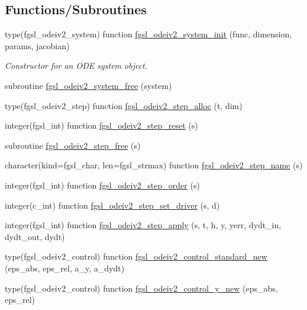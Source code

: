 \subsection*{Functions/\+Subroutines}
\begin{DoxyCompactItemize}
\item 
type(fgsl\+\_\+odeiv2\+\_\+system) function \hyperlink{ode_8finc_a2ffec24e60a38bee53c48aa9c9e3c1b7}{fgsl\+\_\+odeiv2\+\_\+system\+\_\+init} (func, dimension, params, jacobian)
\begin{DoxyCompactList}\small\item\em Constructor for an O\+D\+E system object. \end{DoxyCompactList}\item 
subroutine \hyperlink{ode_8finc_ab973a74e019e0e361f76db2a15b1ce5d}{fgsl\+\_\+odeiv2\+\_\+system\+\_\+free} (system)
\item 
type(fgsl\+\_\+odeiv2\+\_\+step) function \hyperlink{ode_8finc_a38ccf460c6a701df582e42b350fd9eaf}{fgsl\+\_\+odeiv2\+\_\+step\+\_\+alloc} (t, dim)
\item 
integer(fgsl\+\_\+int) function \hyperlink{ode_8finc_a2e77e51cfb8862339548a89edb5b5f16}{fgsl\+\_\+odeiv2\+\_\+step\+\_\+reset} (s)
\item 
subroutine \hyperlink{ode_8finc_a5ba021a1cf3acf48a05c91f83fae1e92}{fgsl\+\_\+odeiv2\+\_\+step\+\_\+free} (s)
\item 
character(kind=fgsl\+\_\+char, len=fgsl\+\_\+strmax) function \hyperlink{ode_8finc_ae18d4d99a73710093fef3a8bd3501d4b}{fgsl\+\_\+odeiv2\+\_\+step\+\_\+name} (s)
\item 
integer(fgsl\+\_\+int) function \hyperlink{ode_8finc_ae49a399cca2cb8575c6a46ea337c477f}{fgsl\+\_\+odeiv2\+\_\+step\+\_\+order} (s)
\item 
integer(c\+\_\+int) function \hyperlink{ode_8finc_a1f1e1c96acf507d235684138e06ae697}{fgsl\+\_\+odeiv2\+\_\+step\+\_\+set\+\_\+driver} (s, d)
\item 
integer(fgsl\+\_\+int) function \hyperlink{ode_8finc_a912c1ed261b3f77c4223b1e1dafbc20b}{fgsl\+\_\+odeiv2\+\_\+step\+\_\+apply} (s, t, h, y, yerr, dydt\+\_\+in, dydt\+\_\+out, dydt)
\item 
type(fgsl\+\_\+odeiv2\+\_\+control) function \hyperlink{ode_8finc_a1830985a3df6d1a333c80ba967e76eec}{fgsl\+\_\+odeiv2\+\_\+control\+\_\+standard\+\_\+new} (eps\+\_\+abs, eps\+\_\+rel, a\+\_\+y, a\+\_\+dydt)
\item 
type(fgsl\+\_\+odeiv2\+\_\+control) function \hyperlink{ode_8finc_aed35a989d1582ac1920fa082fad216d9}{fgsl\+\_\+odeiv2\+\_\+control\+\_\+y\+\_\+new} (eps\+\_\+abs, eps\+\_\+rel)

\end{DoxyCompactItemize}
